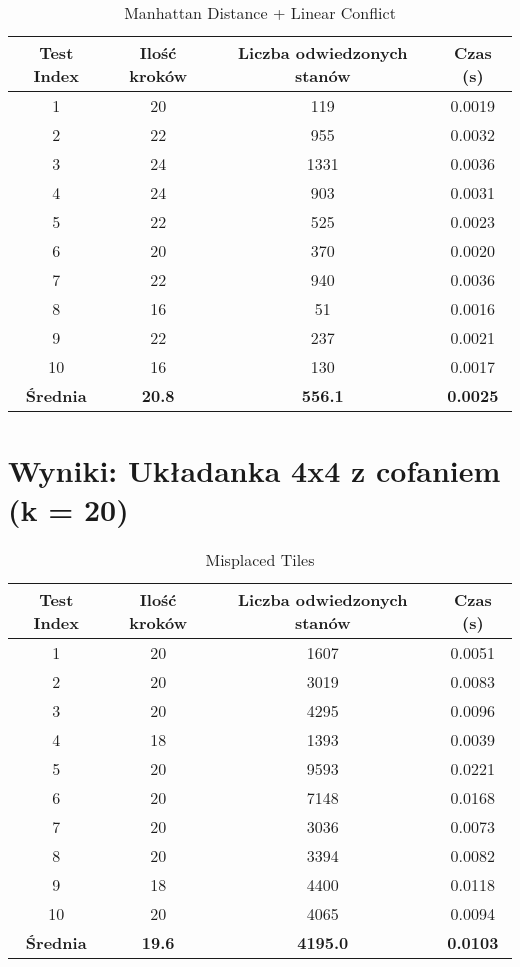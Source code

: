 \documentclass{article}
\begin{document}
\begin{table}[H]
\centering
\caption{Manhattan Distance + Linear Conflict}
\begin{tabular}{|c|c|c|c|}
\hline
Test Index & Ilość kroków & Liczba odwiedzonych stanów & Czas (s) \\ \hline
1 & 20 & 119 & 0.0019 \\ \hline
2 & 22 & 955 & 0.0032 \\ \hline
3 & 24 & 1331 & 0.0036 \\ \hline
4 & 24 & 903 & 0.0031 \\ \hline
5 & 22 & 525 & 0.0023 \\ \hline
6 & 20 & 370 & 0.0020 \\ \hline
7 & 22 & 940 & 0.0036 \\ \hline
8 & 16 & 51 & 0.0016 \\ \hline
9 & 22 & 237 & 0.0021 \\ \hline
10 & 16 & 130 & 0.0017 \\ \hline
\textbf{\textbf{Średnia}} & \textbf{20.8} & \textbf{556.1} & \textbf{0.0025} \\ \hline
\end{tabular}
\end{table}

\section{Wyniki: Układanka 4x4 z cofaniem (k = 20)}
\begin{table}[H]
\centering
\caption{Misplaced Tiles}
\begin{tabular}{|c|c|c|c|}
\hline
Test Index & Ilość kroków & Liczba odwiedzonych stanów & Czas (s) \\ \hline
1 & 20 & 1607 & 0.0051 \\ \hline
2 & 20 & 3019 & 0.0083 \\ \hline
3 & 20 & 4295 & 0.0096 \\ \hline
4 & 18 & 1393 & 0.0039 \\ \hline
5 & 20 & 9593 & 0.0221 \\ \hline
6 & 20 & 7148 & 0.0168 \\ \hline
7 & 20 & 3036 & 0.0073 \\ \hline
8 & 20 & 3394 & 0.0082 \\ \hline
9 & 18 & 4400 & 0.0118 \\ \hline
10 & 20 & 4065 & 0.0094 \\ \hline
\textbf{\textbf{Średnia}} & \textbf{19.6} & \textbf{4195.0} & \textbf{0.0103} \\ \hline
\end{tabular}
\end{table}
\end{document}
